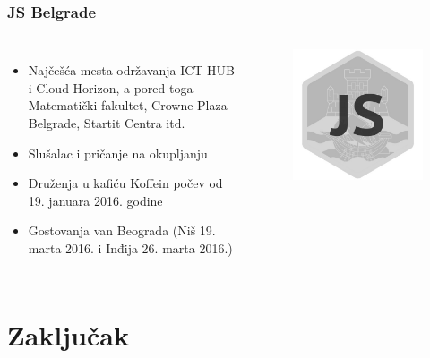 \documentclass[hyperref={bookmarks=false},aspectratio=169]{beamer}
\begin{document}
\begin{frame}
\frametitle{JS Belgrade}

\begin{columns}[T]

\begin{itemize}
    \item Najčešća mesta održavanja ICT HUB i Cloud Horizon, a pored toga Matematički fakultet, Crowne Plaza Belgrade, Startit Centra itd.
    \item Slušalac i pričanje na okupljanju
    \item Druženja u kafiću Koffein počev od 19. januara 2016. godine
    \item Gostovanja van Beograda (Niš 19. marta 2016. i Inđija 26. marta 2016.)
\end{itemize}


\begin{figure}
    \raggedleft
    \includegraphics[scale=0.2]{./images/JS_logo.png}
\end{figure}
\end{columns}
\end{frame}

\section{Zaključak}
\end{document}
